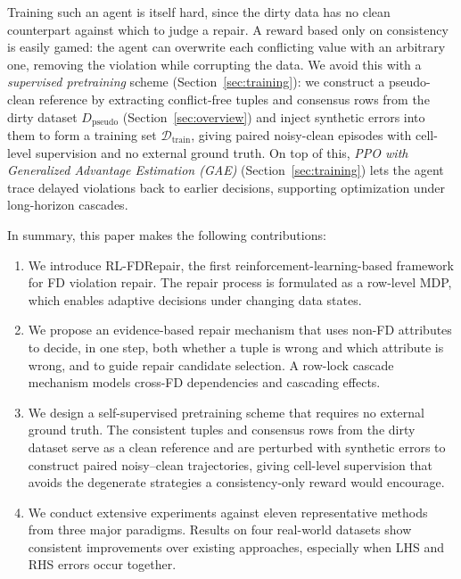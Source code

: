 \documentclass[sigconf]{acmart}
\begin{document}
Training such an agent is itself hard, since the dirty data has no clean counterpart against which to judge a repair. A reward based only on consistency is easily gamed: the agent can overwrite each conflicting value with an arbitrary one, removing the violation while corrupting the data. We avoid this with a \textit{supervised pretraining} scheme (Section~\ref{sec:training}): we construct a pseudo-clean reference by extracting conflict-free tuples and consensus rows from the dirty dataset $D_{\text{pseudo}}$ (Section~\ref{sec:overview}) and inject synthetic errors into them to form a training set $\mathcal{D}_{\text{train}}$, giving paired noisy-clean episodes with cell-level supervision and no external ground truth. On top of this, \textit{PPO with Generalized Advantage Estimation (GAE)} (Section~\ref{sec:training}) lets the agent trace delayed violations back to earlier decisions, supporting optimization under long-horizon cascades.

In summary, this paper makes the following contributions:
\begin{enumerate}
\item We introduce RL-FDRepair, the first reinforcement-learning-based framework for FD violation repair. The repair process is formulated as a row-level MDP, which enables adaptive decisions under changing data states.

\item We propose an evidence-based repair mechanism that uses non-FD attributes to decide, in one step, both whether a tuple is wrong and which attribute is wrong, and to guide repair candidate selection. A row-lock cascade mechanism models cross-FD dependencies and cascading effects.

\item We design a self-supervised pretraining scheme that requires no external ground truth. The consistent tuples and consensus rows from the dirty dataset serve as a clean reference and are perturbed with synthetic errors to construct paired noisy–clean trajectories, giving cell-level supervision that avoids the degenerate strategies a consistency-only reward would encourage.

\item We conduct extensive experiments against eleven representative methods from three major paradigms. Results on four real-world datasets show consistent improvements over existing approaches, especially when LHS and RHS errors occur together.
\end{enumerate}
\end{document}

